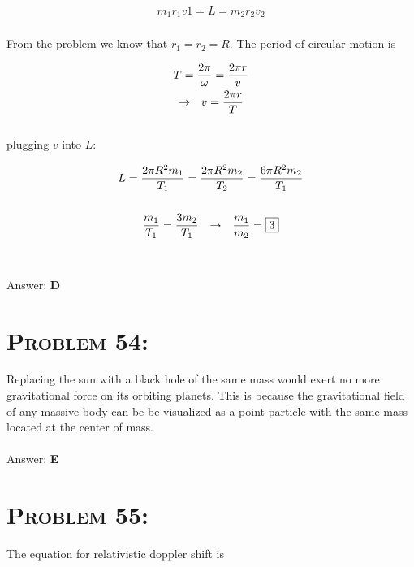 \documentclass{article}
\begin{document}
\begin{align}
m_{1}r_{1}v{1} = L = m_{2}r_{2}v_{2}\nonumber
\end{align}
\\
From the problem we know that $r_{1} = r_{2} = R $. The period of circular motion is

\begin{gather}
T = \frac{2 \pi}{\omega} = \frac{2 \pi r}{v}\\
\rightarrow \hspace{.1in} v = \frac{2 \pi r}{T}\nonumber
\end{gather}
\\
plugging $v$ into $L$:

\begin{gather}
L = \frac{2 \pi R^2 m_{1}}{T_{1}} = \frac{2 \pi R^2 m_{2}}{T_{2}} = \frac{6 \pi R^2 m_{2}}{T_{1}}\nonumber\\
\nonumber\\
\frac{m_{1}}{T_{1}} = \frac{3 m_{2}}{T_{1}} \hspace{.1in} \rightarrow \hspace{.1in} \frac{m_{1}}{m_{2}} = \boxed{3}\nonumber
\end{gather}
\\\\
Answer: \textbf{\textcolor{ProcessBlue}D}\\


\section{\textsc{Problem 54:}} Replacing the sun with a black hole of the same mass would exert no more gravitational force on its orbiting planets. This is because the gravitational field of any massive body can be be visualized as a point particle with the same mass located at the center of mass.
\\\\
Answer: \textbf{\textcolor{ProcessBlue}E}\\


\section{\textsc{Problem 55:}} The equation for relativistic doppler shift is
\end{document}
